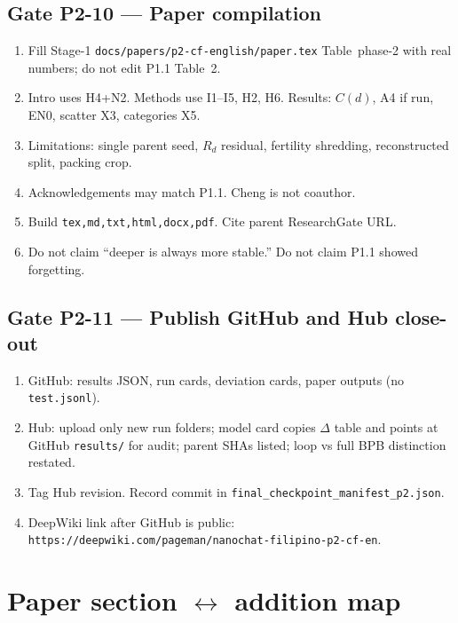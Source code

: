 \documentclass[11pt,a4paper]{article}
\begin{document}
\subsection{Gate P2-10 --- Paper compilation}
\begin{enumerate}
\item Fill Stage-1 \texttt{docs/papers/p2-cf-english/paper.tex} Table~phase-2 with real numbers; do not edit P1.1 Table~2.
\item Intro uses H4+N2. Methods use I1--I5, H2, H6. Results: $C(d)$, A4 if run, EN0, scatter X3, categories X5.
\item Limitations: single parent seed, $R_d$ residual, fertility shredding, reconstructed split, packing crop.
\item Acknowledgements may match P1.1. Cheng is not coauthor.
\item Build \texttt{tex,md,txt,html,docx,pdf}. Cite parent ResearchGate URL.
\item Do not claim ``deeper is always more stable.'' Do not claim P1.1 showed forgetting.
\end{enumerate}

\subsection{Gate P2-11 --- Publish GitHub and Hub close-out}
\begin{enumerate}
\item GitHub: results JSON, run cards, deviation cards, paper outputs (no \texttt{test.jsonl}).
\item Hub: upload only new run folders; model card copies $\Delta$ table and points at GitHub \texttt{results/} for audit; parent SHAs listed; loop vs full BPB distinction restated.
\item Tag Hub revision. Record commit in \texttt{final\_checkpoint\_manifest\_p2.json}.
\item DeepWiki link after GitHub is public: \texttt{https://deepwiki.com/pageman/nanochat-filipino-p2-cf-en}.
\end{enumerate}

\section{Paper section $\leftrightarrow$ addition map}
\label{sec:map}
\end{document}
